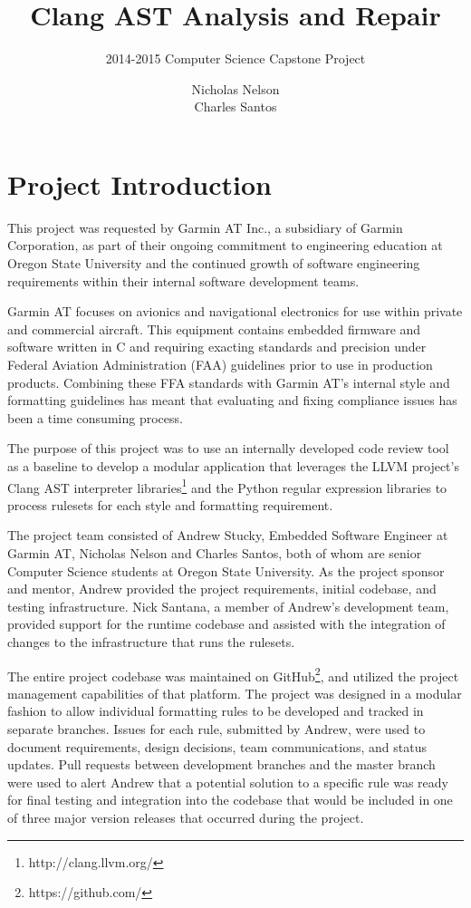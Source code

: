 \documentclass[11pt]{scrreprt}
\title{\textbf{Clang AST Analysis and Repair}}
\subtitle{2014-2015 Computer Science Capstone Project}
\author{Nicholas Nelson\\
		Charles Santos}
\date{}
\begin{document}
\maketitle

\tableofcontents

\chapter{Project Introduction}

This project was requested by Garmin AT Inc., a subsidiary of Garmin Corporation, as part of their ongoing commitment to engineering education at Oregon State University and the continued growth of software engineering requirements within their internal software development teams.

Garmin AT focuses on avionics and navigational electronics for use within private and commercial aircraft.
This equipment contains embedded firmware and software written in C and requiring exacting standards and precision under Federal Aviation Administration (FAA) guidelines prior to use in production products.
Combining these FFA standards with Garmin AT's internal style and formatting guidelines has meant that evaluating and fixing compliance issues has been a time consuming process.

The purpose of this project was to use an internally developed code review tool as a baseline to develop a modular application that leverages the LLVM project's Clang AST interpreter libraries\footnote{http://clang.llvm.org/} and the Python regular expression libraries to process rulesets for each style and formatting requirement.

The project team consisted of Andrew Stucky, Embedded Software Engineer at Garmin AT, Nicholas Nelson and Charles Santos, both of whom are senior Computer Science students at Oregon State University.
As the project sponsor and mentor, Andrew provided the project requirements, initial codebase, and testing infrastructure.
Nick Santana, a member of Andrew's development team, provided support for the runtime codebase and assisted with the integration of changes to the infrastructure that runs the rulesets.

The entire project codebase was maintained on GitHub\footnote{https://github.com/}, and utilized the project management capabilities of that platform.
The project was designed in a modular fashion to allow individual formatting rules to be developed and tracked in separate branches.
Issues for each rule, submitted by Andrew, were used to document requirements, design decisions, team communications, and status updates.
Pull requests between development branches and the master branch were used to alert Andrew that a potential solution to a specific rule was ready for final testing and integration into the codebase that would be included in one of three major version releases that occurred during the project.
\end{document}
